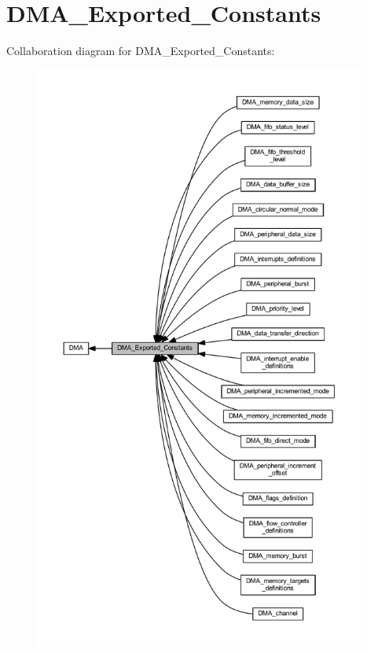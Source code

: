 \hypertarget{group___d_m_a___exported___constants}{}\section{D\+M\+A\+\_\+\+Exported\+\_\+\+Constants}
\label{group___d_m_a___exported___constants}
Collaboration diagram for D\+M\+A\+\_\+\+Exported\+\_\+\+Constants\+:
\nopagebreak
\begin{figure}[H]
\begin{center}
\leavevmode
\includegraphics[height=550pt]{group___d_m_a___exported___constants}
\end{center}
\end{figure}
